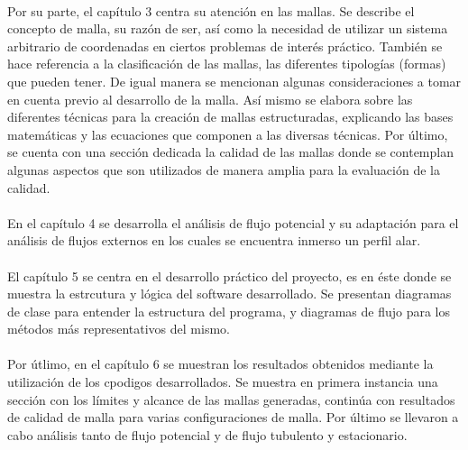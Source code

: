 \documentclass[letterpaper, openright, 12pt]{book}
\begin{document}
    \paragraph*{}
    Por su parte, el capítulo 3 centra su atención en las mallas. Se describe el
    concepto de malla, su razón de ser, así como la necesidad de utilizar un
    sistema arbitrario de coordenadas en ciertos problemas de interés práctico.
    También se hace referencia a la clasificación de las mallas, las diferentes
    tipologías (formas) que pueden tener. De igual manera se mencionan algunas
    consideraciones a tomar en cuenta previo al desarrollo de la malla. Así
    mismo se elabora sobre las diferentes técnicas para la creación de mallas
    estructuradas, explicando las bases matemáticas y las ecuaciones que
    componen a las diversas técnicas. Por último, se cuenta con una sección
    dedicada la calidad de las mallas donde se contemplan algunas aspectos que
    son utilizados de manera amplia para la evaluación de la calidad.

    \paragraph*{}
    En el capítulo 4 se desarrolla el análisis de flujo potencial y su
    adaptación para el análisis de flujos externos en los cuales se encuentra
    inmerso un perfil alar.

    \paragraph*{}
    El capítulo 5 se centra en el desarrollo práctico del proyecto, es en éste
    donde se muestra la estrcutura y lógica del software desarrollado. Se
    presentan diagramas de clase para entender la estructura del programa, y
    diagramas de flujo para los métodos más representativos del mismo.

    \paragraph*{}
    Por útlimo, en el capítulo 6 se muestran los resultados obtenidos mediante
    la utilización de los cpodigos desarrollados. Se muestra en primera
    instancia una sección con los límites y alcance de las mallas generadas,
    continúa con resultados de calidad de malla para varias configuraciones de
    malla. Por último se llevaron a cabo análisis tanto de flujo potencial y de
    flujo tubulento y estacionario.
\end{document}
